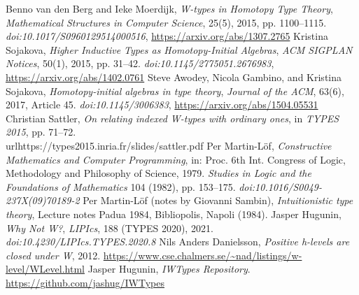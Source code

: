\documentclass{article}
\begin{document}
\begin{thebibliography}{99}
 Benno van den Berg and Ieke Moerdijk, \textit{W-types in Homotopy Type Theory}, \textit{Mathematical Structures in Computer Science}, 25(5), 2015, pp. 1100–1115. \textit{doi:10.1017/S0960129514000516}, \url{https://arxiv.org/abs/1307.2765}
 Kristina Sojakova, \textit{Higher Inductive Types as Homotopy-Initial Algebras}, \textit{ACM SIGPLAN Notices}, 50(1), 2015, pp. 31–42. \textit{doi:10.1145/2775051.2676983}, \url{https://arxiv.org/abs/1402.0761}
 Steve Awodey, Nicola Gambino, and Kristina Sojakova, \textit{Homotopy-initial algebras in type theory}, \textit{Journal of the ACM}, 63(6), 2017, Article 45. \textit{doi:10.1145/3006383}, \url{https://arxiv.org/abs/1504.05531}
 Christian Sattler, \textit{On relating indexed W-types with ordinary ones}, in \textit{TYPES 2015}, pp. 71–72. \\url{https://types2015.inria.fr/slides/sattler.pdf}
 Per Martin-Löf, \textit{Constructive Mathematics and Computer Programming}, in: Proc. 6th Int. Congress of Logic, Methodology and Philosophy of Science, 1979. \textit{Studies in Logic and the Foundations of Mathematics} 104 (1982), pp. 153–175. \textit{doi:10.1016/S0049-237X(09)70189-2}
 Per Martin-Löf (notes by Giovanni Sambin), \textit{Intuitionistic type theory}, Lecture notes Padua 1984, Bibliopolis, Napoli (1984).
 Jasper Hugunin, \textit{Why Not W?}, \textit{LIPIcs}, 188 (TYPES 2020), 2021. \textit{doi:10.4230/LIPIcs.TYPES.2020.8}
 Nils Anders Danielsson, \textit{Positive h-levels are closed under W}, 2012. \url{https://www.cse.chalmers.se/~nad/listings/w-level/WLevel.html}
 Jasper Hugunin, \textit{IWTypes Repository}. \url{https://github.com/jashug/IWTypes}

\end{thebibliography}
\end{document}
